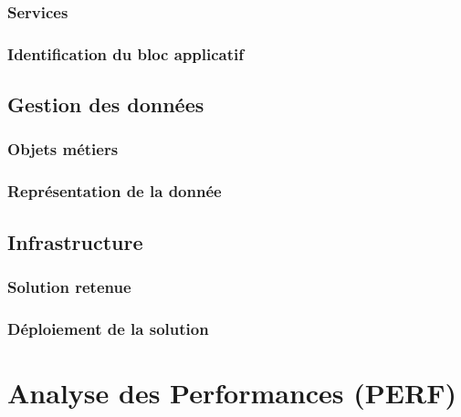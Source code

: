 \subsubsection{Services}


\subsubsection{Identification du bloc applicatif}


\subsection{Gestion des données}

\subsubsection{Objets métiers}


\subsubsection{Représentation de la donnée}


\subsection{Infrastructure}

\subsubsection{Solution retenue}


\subsubsection{Déploiement de la solution}


\section{Analyse des Performances (PERF)}%

